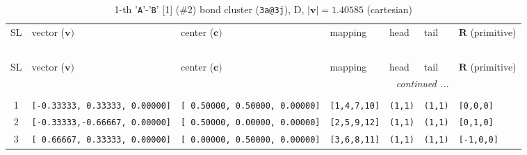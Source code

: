 \documentclass[fleqn,10pt,landscape]{jsarticle}
\begin{document}
\begin{longtable}[l]{cllllll}
\captionsetup{justification=raggedright, singlelinecheck=off}
\caption{1-th '\texttt{A}'-'\texttt{B}' [1] (\#2) bond cluster (\texttt{3a@3j}), D, $|\bm{v}|=1.40585$ (cartesian)}
 \\
 \hline \hline
SL & vector ($\bm{v})$ & center ($\bm{c})$ & mapping & head & tail & $\bm{R}$ (primitive) \\ \hline \endfirsthead

\multicolumn{6}{l}{\tablename\ \thetable{}} \\
 \hline \hline
SL & vector ($\bm{v})$ & center ($\bm{c})$ & mapping & head & tail & $\bm{R}$ (primitive) \\ \hline \endhead

 \hline \hline
\multicolumn{6}{r}{\footnotesize\it continued ...} \\ \endfoot

 \hline \hline
\multicolumn{6}{r}{} \\ \endlastfoot

1 & \texttt{[-0.33333, 0.33333, 0.00000]} & \texttt{[ 0.50000, 0.50000, 0.00000]} & \texttt{[1,4,7,10]} & \texttt{(1,1)} & \texttt{(1,1)} & \texttt{[0,0,0]} \\ \hline
2 & \texttt{[-0.33333,-0.66667, 0.00000]} & \texttt{[ 0.50000, 0.00000, 0.00000]} & \texttt{[2,5,9,12]} & \texttt{(1,1)} & \texttt{(1,1)} & \texttt{[0,1,0]} \\ \hline
3 & \texttt{[ 0.66667, 0.33333, 0.00000]} & \texttt{[ 0.00000, 0.50000, 0.00000]} & \texttt{[3,6,8,11]} & \texttt{(1,1)} & \texttt{(1,1)} & \texttt{[-1,0,0]} \\
\end{longtable}
\renewcommand{\arraystretch}{1.6}
\end{document}
